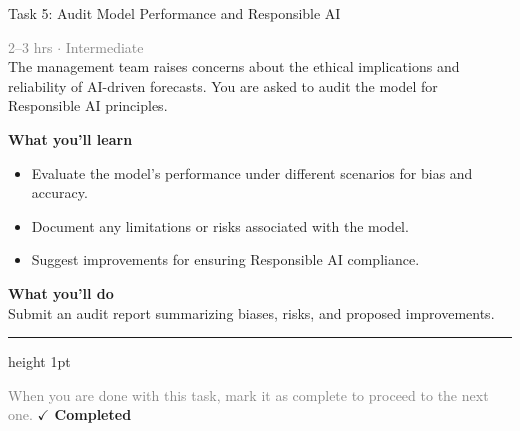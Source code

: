 \documentclass[10pt,a4paper]{article}
\begin{document}
\begin{taskbox}{Task 5: Audit Model Performance and Responsible AI}

    {\small \textcolor{gray}{2--3 hrs $\cdot$ Intermediate}}\\[12pt]

      
The management team raises concerns about the ethical implications and reliability of AI-driven forecasts. You are asked to audit the model for Responsible AI principles.  


\vspace{8pt}
{\large \textbf{\textcolor{brandLight}{What you'll learn}}}\\[4pt]  
\begin{itemize}
    \item Evaluate the model’s performance under different scenarios for bias and accuracy.  
    \item Document any limitations or risks associated with the model.  
    \item Suggest improvements for ensuring Responsible AI compliance.  
\end{itemize}

\vspace{8pt}
{\large \textbf{\textcolor{brandLight}{What you'll do}}}\\[4pt]  
Submit an audit report summarizing biases, risks, and proposed improvements.\par

    \vspace{16pt}

    \textcolor{cardBorder}{\hrule height 1pt}\vspace{8pt}

    \small \textcolor{gray}{When you are done with this task, mark it as complete to proceed to the next one.} \hfill \textbf{\textcolor{brandDark}{$\checkmark$ Completed}}

\end{taskbox}
\end{document}
